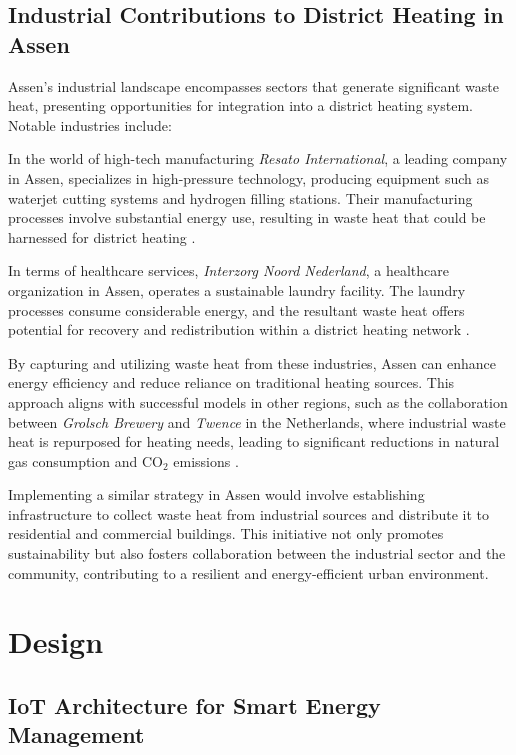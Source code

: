 \documentclass{article}
\begin{document}
\subsection{Industrial Contributions to District Heating in Assen}

Assen's industrial landscape encompasses sectors that generate significant waste heat, presenting opportunities for integration into a district heating system. Notable industries include:

In the world of high-tech manufacturing \textit{Resato International}, a leading company in Assen, specializes in high-pressure technology, producing equipment such as waterjet cutting systems and hydrogen filling stations. Their manufacturing processes involve substantial energy use, resulting in waste heat that could be harnessed for district heating \cite{resato_sustainability}.

In terms of healthcare services, \textit{Interzorg Noord Nederland}, a healthcare organization in Assen, operates a sustainable laundry facility. The laundry processes consume considerable energy, and the resultant waste heat offers potential for recovery and redistribution within a district heating network \cite{interzorg_laundry}.

By capturing and utilizing waste heat from these industries, Assen can enhance energy efficiency and reduce reliance on traditional heating sources. This approach aligns with successful models in other regions, such as the collaboration between \textit{Grolsch Brewery} and \textit{Twence} in the Netherlands, where industrial waste heat is repurposed for heating needs, leading to significant reductions in natural gas consumption and CO$_2$ emissions \cite{grolsch_twence}.

Implementing a similar strategy in Assen would involve establishing infrastructure to collect waste heat from industrial sources and distribute it to residential and commercial buildings. This initiative not only promotes sustainability but also fosters collaboration between the industrial sector and the community, contributing to a resilient and energy-efficient urban environment.


\section{Design}

\subsection{IoT Architecture for Smart Energy Management}
\end{document}
